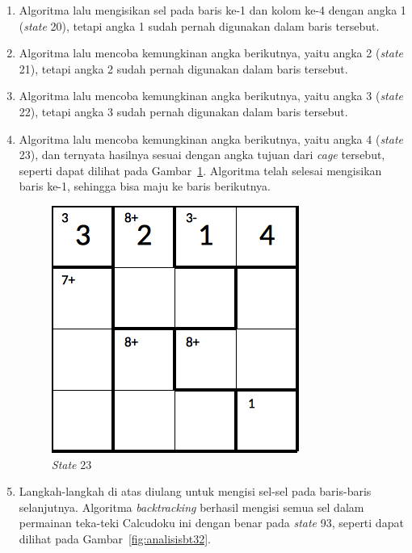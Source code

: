 \begin{enumerate}
\item Algoritma lalu mengisikan sel pada baris ke-1 dan kolom ke-4 dengan angka 1 (\textit{state} 20), tetapi angka 1 sudah pernah digunakan dalam baris tersebut.
\item Algoritma lalu mencoba kemungkinan angka berikutnya, yaitu angka 2 (\textit{state} 21), tetapi angka 2 sudah pernah digunakan dalam baris tersebut.
\item Algoritma lalu mencoba kemungkinan angka berikutnya, yaitu angka 3 (\textit{state} 22), tetapi angka 3 sudah pernah digunakan dalam baris tersebut.
\item Algoritma lalu mencoba kemungkinan angka berikutnya, yaitu angka 4 (\textit{state} 23), dan ternyata hasilnya sesuai dengan angka tujuan dari \textit{cage} tersebut, seperti dapat dilihat pada Gambar~\ref{fig:analisisbt8}. Algoritma telah selesai mengisikan baris ke-1, sehingga bisa maju ke baris berikutnya.

\begin{figure}
\centering
\captionsetup{justification=centering}
\includegraphics[scale=0.333]{Gambar/backtracking/State23}
\caption[\textit{State} 23]{\textit{State} 23}
\label{fig:analisisbt8}
\end{figure}

\item Langkah-langkah di atas diulang untuk mengisi sel-sel pada baris-baris selanjutnya. Algoritma \textit{backtracking} berhasil mengisi semua sel dalam permainan teka-teki Calcudoku ini dengan benar pada \textit{state} 93, seperti dapat dilihat pada Gambar~\ref{fig:analisisbt32}.


\end{enumerate}
